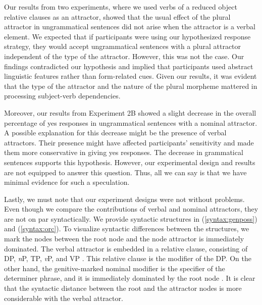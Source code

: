 Our results from two experiments, where we used verbs of a reduced object relative clauses as an attractor, showed that the usual effect of the plural attractor in ungrammatical sentences did not arise when the attractor is a verbal element. We expected that if participants were using our hypothesized response strategy, they would accept ungrammatical sentences with a plural attractor independent of the type of the attractor. However, this was not the case. Our findings contradicted our hypothesis and implied that participants used abstract linguistic features rather than form-related cues. Given our results, it was evident that the type of the attractor and the nature of the plural morpheme mattered in processing subject-verb dependencies. 

Moreover, our results from Experiment 2B showed a slight decrease in the overall percentage of yes responses in ungrammatical sentences with a nominal attractor. A possible explanation for this decrease might be the presence of verbal attractors. Their presence might have affected participants' sensitivity and made them more conservative in giving yes responses. The decrease in grammatical sentences supports this hypothesis. However, our experimental design and results are not equipped to answer this question. Thus, all we can say is that we have minimal evidence for such a speculation.

Lastly, we must note that our experiment designs were not without problems. Even though we compare the contributions of verbal and nominal attractors, they are not on par syntactically. We provide syntactic structures in (\ref{syntax:genposs}) and (\ref{syntax:orc}). To visualize syntactic differences between the structures, we mark the nodes between the root node and the node attractor is immediately dominated. The verbal attractor is embedded in a relative clause, consisting of DP, \emph{n}P, TP, \emph{v}P, and VP \citep{Aygen2002}. This relative clause is the modifier of the DP. On the other hand, the genitive-marked nominal modifier is the specifier of the determiner phrase, and it is immediately dominated by the root node \cite{OzturkTaylan2016}. It is clear that the syntactic distance between the root and the attractor nodes is more considerable with the verbal attractor.


